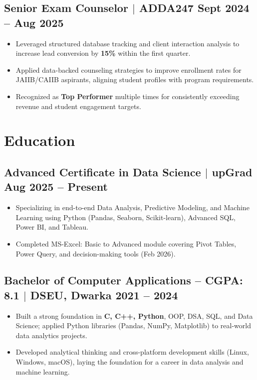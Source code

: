 \documentclass[10pt]{article}
\begin{document}
\subsection{Senior Exam Counselor $|$ ADDA247 \hfill Sept 2024 -- Aug 2025}
\begin{itemize}
    \item Leveraged structured database tracking and client interaction analysis to increase lead conversion by \textbf{15\%} within the first quarter.
    \item Applied data-backed counseling strategies to improve enrollment rates for JAIIB/CAIIB aspirants, aligning student profiles with program requirements.
    \item Recognized as \textbf{Top Performer} multiple times for consistently exceeding revenue and student engagement targets.
\end{itemize}

\section{Education}

\subsection{Advanced Certificate in Data Science $|$ upGrad \hfill Aug 2025 -- Present}
\begin{itemize}
    \item Specializing in end-to-end Data Analysis, Predictive Modeling, and Machine Learning using Python (Pandas, Seaborn, Scikit-learn), Advanced SQL, Power BI, and Tableau.
    \item Completed MS-Excel: Basic to Advanced module covering Pivot Tables, Power Query, and decision-making tools (Feb 2026).
\end{itemize}

\subsection{Bachelor of Computer Applications -- CGPA: 8.1 $|$ DSEU, Dwarka \hfill 2021 -- 2024}
\begin{itemize}
    \item Built a strong foundation in \textbf{C, C++, Python}, OOP, DSA, SQL, and Data Science; applied Python libraries (Pandas, NumPy, Matplotlib) to real-world data analytics projects.
    \item Developed analytical thinking and cross-platform development skills (Linux, Windows, macOS), laying the foundation for a career in data analysis and machine learning.
\end{itemize}
\end{document}
